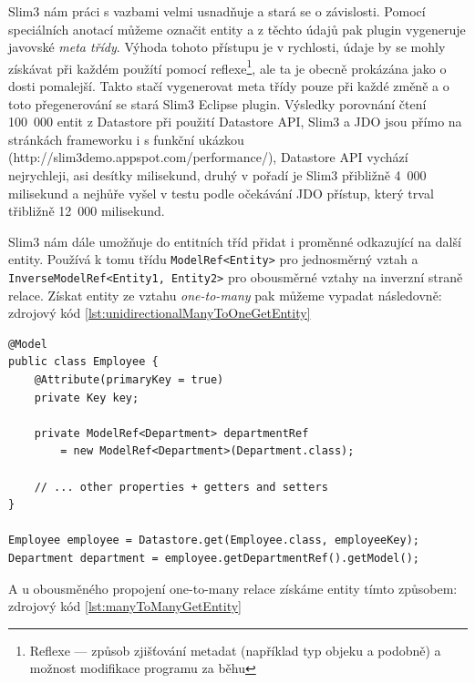 Slim3 nám práci s vazbami velmi usnadňuje a stará se o závislosti. Pomocí speciálních anotací můžeme označit entity a z těchto údajů pak plugin vygeneruje javovské \emph{meta třídy}. Výhoda tohoto přístupu je v rychlosti, údaje by se mohly získávat při každém použítí pomocí reflexe\footnote{Reflexe --- způsob zjišťování metadat (například typ objeku a podobně) a možnost modifikace programu za běhu}, ale ta je obecně  prokázána jako o dosti pomalejší. Takto stačí vygenerovat meta třídy pouze při každé změně a o toto přegenerování se stará Slim3 Eclipse plugin. Výsledky porovnání čtení 100~000 entit z Datastore při použití Datastore API, Slim3 a JDO jsou přímo na stránkách frameworku i s funkční ukázkou (http://slim3demo.appspot.com/performance/), Datastore API vychází nejrychleji, asi desítky milisekund, druhý v pořadí je Slim3 přibližně 4~000 milisekund a nejhůře vyšel v testu podle očekávání JDO přístup, který trval třibližně 12~000 milisekund. 

Slim3 nám dále umožňuje do entitních tříd přidat i proměnné odkazující na další entity. Používá k tomu třídu \verb|ModelRef<Entity>| pro jednosměrný vztah a \verb| InverseModelRef<Entity1, Entity2>| pro obousměrné vztahy na inverzní straně relace. Získat entity ze vztahu \emph{one-to-many} pak můžeme vypadat následovně: zdrojový kód \ref{lst:unidirectionalManyToOneGetEntity}

\begin{lstlisting}[caption={Získání entity},label=lst:unidirectionalManyToOneGetEntity,belowcaptionskip=0.4cm]
@Model
public class Employee {
	@Attribute(primaryKey = true)
	private Key key;
	
	private ModelRef<Department> departmentRef 
		= new ModelRef<Department>(Department.class);
	
	// ... other properties + getters and setters
}

Employee employee = Datastore.get(Employee.class, employeeKey);
Department department = employee.getDepartmentRef().getModel();
\end{lstlisting}

A u obousměného propojení one-to-many relace získáme entity tímto způsobem: zdrojový kód \ref{lst:manyToManyGetEntity}

